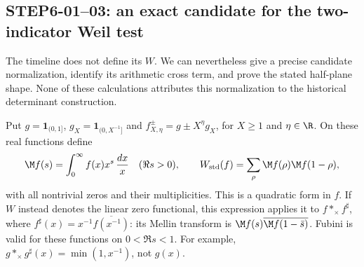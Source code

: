 \subsection{STEP6-01--03: an exact candidate for the two-indicator Weil test}
The timeline does not define its $W$. We can nevertheless give a precise candidate normalization, identify its arithmetic cross term, and prove the stated half-plane shape. None of these calculations attributes this normalization to the historical determinant construction.

Put $g=\mathbf1_{(0,1]}$, $g_X=\mathbf1_{(0,X^{-1}]}$ and $f^\pm_{X,\eta}=g\pm X^\eta g_X$, for $X\ge1$ and $\eta\in\R$. On these real functions define
\[
 \M f(s)=\int_0^\infty f(x)x^s\,\frac{dx}{x}\quad(\Re s>0),
 \qquad W_{\rm std}(f)=\sum_\rho\M f(\rho)\M f(1-\rho),
\]
with all nontrivial zeros and their multiplicities. This is a quadratic form in $f$. If $W$ instead denotes the linear zero functional, this expression applies it to $f*_\times f^\sharp$, where $f^\sharp(x)=x^{-1}\overline{f(x^{-1})}$: its Mellin transform is $\M f(s)\overline{\M f(1-\bar s)}$. Fubini is valid for these functions on $0<\Re s<1$. For example, $g*_\times g^\sharp(x)=\min(1,x^{-1})$, not $g(x)$.

